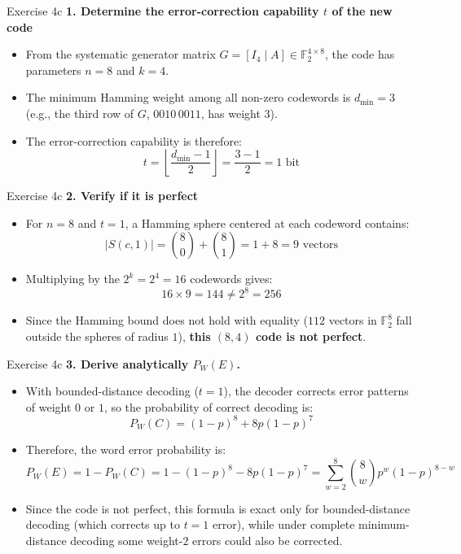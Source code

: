 \documentclass[10pt, aspectratio=169]{beamer}
\newcommand{\question}[1]{{\color{QuestionRed}\textbf{#1}}}
\begin{document}
\begin{frame}{Exercise 4c}
  \question{1. Determine the error-correction capability $t$ of the new code}

  \vspace{0.25cm}
  \begin{itemize}
    \item From the systematic generator matrix $G = [I_4 \mid A] \in \mathbb{F}_2^{4 \times 8}$, the code has parameters $n = 8$ and $k = 4$.
    \item The minimum Hamming weight among all non-zero codewords is $d_{\min} = 3$ (e.g., the third row of $G$, $0010\,0011$, has weight $3$).
    \item The error-correction capability is therefore:
    \[
      t = \left\lfloor \frac{d_{\min} - 1}{2} \right\rfloor = \frac{3 - 1}{2} = 1\text{ bit}
    \]
  \end{itemize}
\end{frame}

\begin{frame}{Exercise 4c}
  \question{2. Verify if it is perfect}

  \vspace{0.25cm}
  \begin{itemize}
    \item For $n = 8$ and $t = 1$, a Hamming sphere centered at each codeword contains:
    \[
      |S(c, 1)| = \binom{8}{0} + \binom{8}{1} = 1 + 8 = 9\text{ vectors}
    \]
    \item Multiplying by the $2^k = 2^4 = 16$ codewords gives:
    \[
      16 \times 9 = 144 \neq 2^8 = 256
    \]
    \item Since the Hamming bound does not hold with equality ($112$ vectors in $\mathbb{F}_2^8$ fall outside the spheres of radius $1$), \textbf{this $(8,4)$ code is not perfect}.
  \end{itemize}
\end{frame}

\begin{frame}{Exercise 4c}
  \question{3. Derive analytically $P_W(E)$.}

  \vspace{0.25cm}
  \begin{itemize}
    \item With bounded-distance decoding ($t = 1$), the decoder corrects error patterns of weight $0$ or $1$, so the probability of correct decoding is:
    \[
      P_W(C) = (1 - p)^8 + 8p(1 - p)^7
    \]
    \item Therefore, the word error probability is:
    \[
      P_W(E) = 1 - P_W(C) = 1 - (1 - p)^8 - 8p(1 - p)^7 = \sum_{w=2}^{8} \binom{8}{w} p^w (1 - p)^{8 - w}
    \]
    \item Since the code is not perfect, this formula is exact only for bounded-distance decoding (which corrects up to $t=1$ error), while under complete minimum-distance decoding some weight-$2$ errors could also be corrected.
  \end{itemize}
\end{frame}
\end{document}
